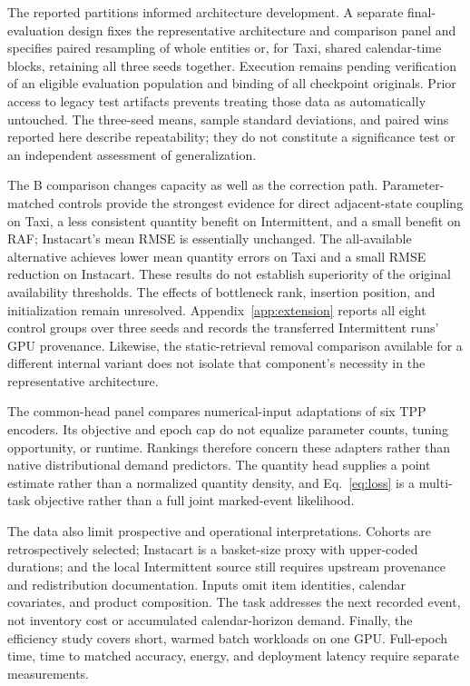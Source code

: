 \documentclass[runningheads]{llncs}
\begin{document}
The reported partitions informed architecture development. A separate
final-evaluation design fixes the representative architecture and comparison
panel and specifies paired resampling of whole entities or, for Taxi,
shared calendar-time blocks, retaining all three seeds together. Execution
remains pending verification of an
eligible evaluation population and binding of all checkpoint originals.
Prior access to legacy test artifacts prevents treating those data as
automatically untouched. The three-seed means, sample standard deviations,
and paired wins reported here describe repeatability; they do not constitute
a significance test or an independent assessment of generalization.

The B comparison changes capacity as well as the correction path.
Parameter-matched controls provide the strongest evidence for direct
adjacent-state coupling on Taxi, a less consistent quantity benefit on
Intermittent, and a small benefit on RAF; Instacart's mean RMSE is essentially
unchanged. The all-available alternative achieves lower mean quantity errors
on Taxi and a small RMSE reduction on Instacart. These results do not establish
superiority of the original availability thresholds. The effects of bottleneck
rank, insertion position, and initialization remain unresolved.
Appendix~\ref{app:extension} reports all eight control groups over three
seeds and records the transferred Intermittent runs' GPU provenance. Likewise, the static-retrieval removal
comparison available for a different internal variant does not isolate
that component's necessity in the representative architecture.

The common-head panel compares numerical-input adaptations of six TPP
encoders. Its objective and epoch cap do not equalize parameter counts,
tuning opportunity, or runtime. Rankings therefore concern these adapters
rather than native distributional demand predictors.
The quantity head supplies a point estimate rather than a normalized quantity
density, and Eq.~\eqref{eq:loss} is a multi-task objective rather than a full
joint marked-event likelihood.

The data also limit prospective and operational interpretations. Cohorts are
retrospectively selected; Instacart is a basket-size proxy with upper-coded
durations; and the local Intermittent source still requires upstream
provenance and redistribution documentation. Inputs omit item identities,
calendar covariates, and product composition. The task addresses the next
recorded event, not inventory cost or accumulated calendar-horizon demand.
Finally, the efficiency study covers short, warmed batch workloads on one
GPU. Full-epoch time, time to matched accuracy, energy, and deployment
latency require separate measurements.
\end{document}
